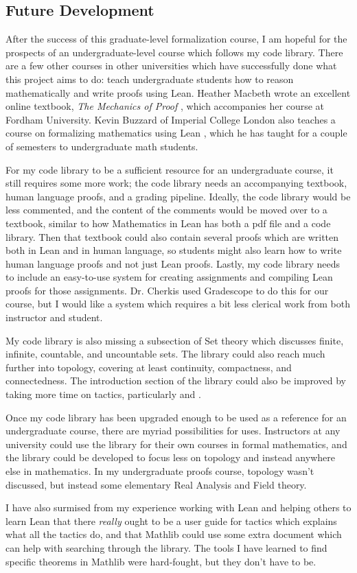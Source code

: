 \subsection{Future Development}

After the success of this graduate-level formalization course, I am
hopeful for the prospects of an undergraduate-level course which
follows my code library. There are a few other courses in other
universities which have successfully done what this project aims to do:
teach undergraduate students how to reason mathematically and write proofs
using Lean. Heather Macbeth wrote an excellent online textbook, 
\textit{The Mechanics of Proof} \cite{Macbeth}, 
which accompanies her course at Fordham University. 
Kevin Buzzard of Imperial College London also teaches a course on 
formalizing mathematics using Lean \cite{Buzzard}, 
which he has taught for a couple of 
semesters to undergraduate math students. 

For my code library to be a sufficient resource for an undergraduate course, 
it still requires some more work; the code library needs an accompanying 
textbook, human language proofs, and a grading pipeline. Ideally, the code
library would be less commented, and the content of the comments would be moved
over to a textbook, similar to how Mathematics in Lean has both a pdf file
and a code library. Then that textbook could also contain several proofs which
are written both in Lean and in human language, so students might also
learn how to write human language proofs and not just Lean proofs. Lastly, 
my code library needs to include an easy-to-use system for creating assignments
and compiling Lean proofs for those assignments. Dr. Cherkis used Gradescope to
do this for our course, but I would like a system which requires a bit less clerical
work from both instructor and student.

My code library is also missing a subsection of Set theory which discusses
finite, infinite, countable, and uncountable sets. The library could also
reach much further into topology, covering at least continuity, compactness, and
connectedness. The introduction section of the library could also be improved 
by taking more time on tactics, particularly  and .

Once my code library has been upgraded enough to be used as a reference for
an undergraduate course, there are myriad possibilities for uses.
Instructors at any university could use the library for their own courses
in formal mathematics, and the library could be developed to focus less on
topology and instead anywhere else in mathematics. In my undergraduate proofs
course, topology wasn't discussed, but instead some elementary Real Analysis and
Field theory. 

I have also surmised from my experience working with Lean and helping
others to learn Lean that there \textit{really} ought to be a user guide
for tactics which explains what all the tactics do, and that Mathlib could
use some extra document which can help with searching through the library. 
The tools I have learned to find specific theorems in Mathlib were hard-fought,
but they don't have to be.
